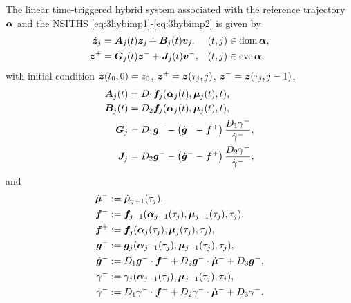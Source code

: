 \documentclass[../DC2017114Bouma.tex]{subfiles}
\begin{document}
\begin{sloppypar}
\begin{mydef}[LTTHS]\label{def:3ltths}
The linear time-triggered hybrid system associated with the reference trajectory $\alphab$ and the NSITHS \eqref{eq:3hybimp1}-\eqref{eq:3hybimp2} is given by
\begin{align}
\dot{\zb}_j &= \Ab_j(t)\zb_j + \Bb_j(t)\vb_j, &(t,j)&\in \dom\alphab,\\
\zb^+ &= \Gb_j(t)\zb^- + \Jb_j(t)\vb^-, &(t,j)&\in \eve\alphab,
\end{align}
with initial condition $\zb(t_0,0)=z_0$, $\zb^+ = \zb(\tau_j,j)$, $\zb^- = \zb(\tau_j,j-1)$,
\begin{align*}
\Ab_j(t) &= D_1\fb_j(\alphab_j(t),\mub_j(t),t),\\
\Bb_j(t) &= D_2\fb_j(\alphab_j(t),\mub_j(t),t),\\
\Gb_j &= D_1\gb^- - \left(\dot{\gb}^- - \fb^+\right)\frac{D_1\gamma^-}{\dot{\gamma}^-},\\
\Jb_j &= D_2\gb^- - \left(\dot{\gb}^- - \fb^+\right)\frac{D_2\gamma^-}{\dot{\gamma}^-},
\end{align*}
and
\begin{align*}
\dot{\mub}^- &:= \dot{\mub}_{j-1}(\tau_j),\\
\fb^- &:= \fb_{j-1}(\alphab_{j-1}(\tau_j),\mub_{j-1}(\tau_j),\tau_j),\\
\fb^+ &:= \fb_j(\alphab_j(\tau_j),\mub_j(\tau_j),\tau_j),\\
\gb^- &:= \gb_{j}(\alphab_{j-1}(\tau_j),\mub_{j-1}(\tau_j),\tau_j),\\
\dot{\gb}^- &:= D_1\gb^-\cdot \fb^- + D_2\gb^-\cdot \dot{\mub}^- + D_3\gb^-,\\
\gamma^- &:= \gamma_j(\alphab_{j-1}(\tau_j),\mub_{j-1}(\tau_j),\tau_j),\\
\dot{\gamma}^- &:= D_1\gamma^-\cdot\fb^- + D_2\gamma^-\cdot\dot{\mub}^- + D_3\gamma^-.
\end{align*}
\end{mydef}
\end{sloppypar}
\end{document}
